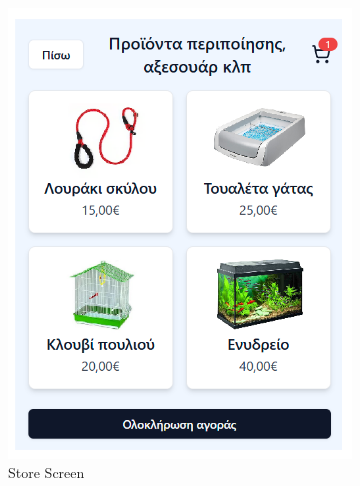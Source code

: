 \documentclass[12pt,a4paper,twoside]{book}
\begin{document}
\begin{figure}[H]
    \centering
    \begin{subfigure}[b]{0.48\textwidth}
        \centering
        \includegraphics[width=\textwidth]{Resources/Mockup Screens/mockup-store.png}
        \caption{Store Screen}\label{fig:mockup5}
    \end{subfigure}
    \hfill
    \begin{subfigure}[b]{0.48\textwidth}
        \centering

\end{subfigure}
\end{figure}
\end{document}
